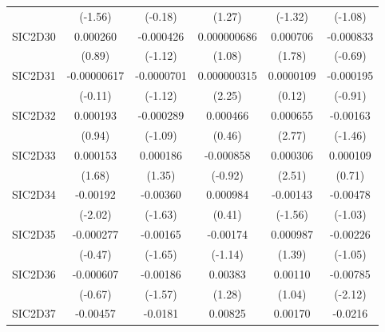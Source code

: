 \begin{table}[htbp]
\begin{tabular}{l*{5}{c}}
            &     (-1.56)         &     (-0.18)         &      (1.27)         &     (-1.32)         &     (-1.08)         \\
SIC2D30     &    0.000260         &   -0.000426         & 0.000000686         &    0.000706         &   -0.000833         \\
            &      (0.89)         &     (-1.12)         &      (1.08)         &      (1.78)         &     (-0.69)         \\
SIC2D31     & -0.00000617         &  -0.0000701         & 0.000000315\sym{*}  &   0.0000109         &   -0.000195         \\
            &     (-0.11)         &     (-1.12)         &      (2.25)         &      (0.12)         &     (-0.91)         \\
SIC2D32     &    0.000193         &   -0.000289         &    0.000466         &    0.000655\sym{**} &    -0.00163         \\
            &      (0.94)         &     (-1.09)         &      (0.46)         &      (2.77)         &     (-1.46)         \\
SIC2D33     &    0.000153         &    0.000186         &   -0.000858         &    0.000306\sym{*}  &    0.000109         \\
            &      (1.68)         &      (1.35)         &     (-0.92)         &      (2.51)         &      (0.71)         \\
SIC2D34     &    -0.00192\sym{*}  &    -0.00360         &    0.000984         &    -0.00143         &    -0.00478         \\
            &     (-2.02)         &     (-1.63)         &      (0.41)         &     (-1.56)         &     (-1.03)         \\
SIC2D35     &   -0.000277         &    -0.00165         &    -0.00174         &    0.000987         &    -0.00226         \\
            &     (-0.47)         &     (-1.65)         &     (-1.14)         &      (1.39)         &     (-1.05)         \\
SIC2D36     &   -0.000607         &    -0.00186         &     0.00383         &     0.00110         &    -0.00785\sym{*}  \\
            &     (-0.67)         &     (-1.57)         &      (1.28)         &      (1.04)         &     (-2.12)         \\
SIC2D37     &    -0.00457         &     -0.0181\sym{***}&     0.00825         &     0.00170         &     -0.0216         \\

\end{tabular}
\end{table}
